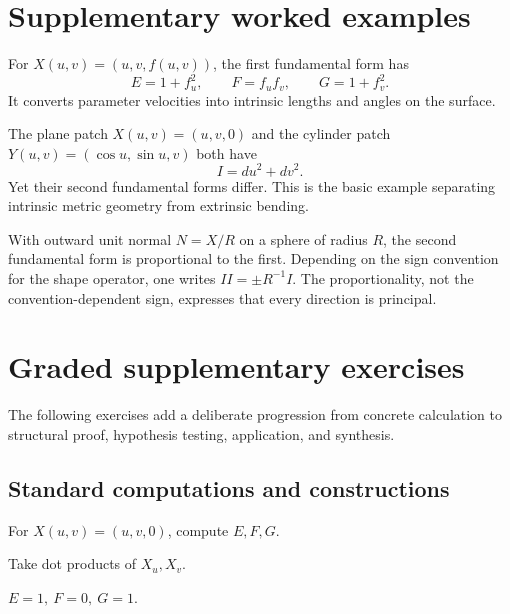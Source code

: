 \section{Supplementary worked examples}
\label{sec:vii15-pedagogy}

\begin{example}\label{ex:vii15-ped-01}
For \(X(u,v)=(u,v,f(u,v))\), the first fundamental form has
\[
E=1+f_u^2,\qquad F=f_uf_v,\qquad G=1+f_v^2.
\]
It converts parameter velocities into intrinsic lengths and angles on the surface.
\end{example}

\begin{example}\label{ex:vii15-ped-02}
The plane patch \(X(u,v)=(u,v,0)\) and the cylinder patch \(Y(u,v)=(\cos u,\sin u,v)\) both have
\[
I=du^2+dv^2.
\]
Yet their second fundamental forms differ.  This is the basic example separating intrinsic metric geometry from extrinsic bending.
\end{example}

\begin{example}\label{ex:vii15-ped-03}
With outward unit normal \(N=X/R\) on a sphere of radius \(R\), the second fundamental form is proportional to the first.  Depending on the sign convention for the shape operator, one writes \(II=\pm R^{-1}I\).  The proportionality, not the convention-dependent sign, expresses that every direction is principal.
\end{example}

\section{Graded supplementary exercises}
The following exercises add a deliberate progression from concrete calculation to structural proof, hypothesis testing, application, and synthesis.

\subsection*{Standard computations and constructions}

\begin{exercise}\label{exr:vii15-ped-01}
For \(X(u,v)=(u,v,0)\), compute \(E,F,G\).
\end{exercise}
\begin{hint}
Take dot products of \(X_u,X_v\).
\end{hint}
\begin{solution}
\(E=1,\ F=0,\ G=1\).
\end{solution}

